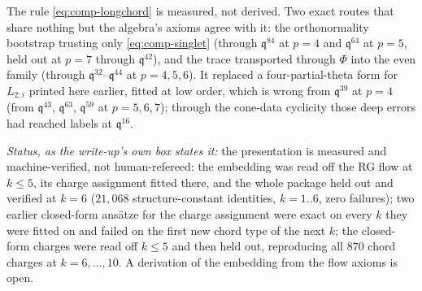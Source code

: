 \documentclass[11pt]{amsart}
\newcommand\fq{\mathfrak{q}}
\theoremstyle{remark}
\begin{document}
The rule \eqref{eq:comp-longchord} is measured, not derived.  Two exact
routes that share nothing but the algebra's axioms agree with it: the
orthonormality bootstrap trusting only \eqref{eq:comp-singlet} (through
$\fq^{84}$ at $p=4$ and $\fq^{64}$ at $p=5$, held out at $p=7$ through
$\fq^{42}$), and the trace transported through $\Phi$ into the even family
(through $\fq^{32}$--$\fq^{44}$ at $p=4,5,6$).  It replaced a four-partial-theta
form for $L_{2;i}$ printed here earlier, fitted at low order, which is wrong
from $\fq^{39}$ at $p=4$ (from $\fq^{43}$, $\fq^{63}$, $\fq^{59}$ at $p=5,6,7$);
through the cone-data cyclicity those deep errors had reached labels at
$\fq^{16}$.

\medskip\noindent\emph{Status, as the write-up's own box states it:}
the presentation is measured and machine-verified, not human-refereed:
the embedding was read off the RG flow at $k\le5$, its charge assignment
fitted there, and the whole package held out and verified at $k=6$
($21{,}068$ structure-constant identities, $k=1..6$, zero failures); two
earlier closed-form ans\"atze for the charge assignment were exact on
every $k$ they were fitted on and failed on the first new chord type of
the next $k$; the closed-form charges were read off $k\le5$ and then held
out, reproducing all $870$ chord charges at $k=6,\dots,10$.  A derivation
of the embedding from the flow axioms is open.
\end{document}

